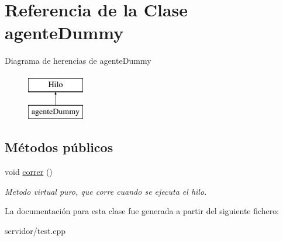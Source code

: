 \hypertarget{classagenteDummy}{\section{\-Referencia de la \-Clase agente\-Dummy}
\label{classagenteDummy}
}
\-Diagrama de herencias de agente\-Dummy\begin{figure}[H]
\begin{center}
\leavevmode
\includegraphics[height=2.000000cm]{classagenteDummy}
\end{center}
\end{figure}
\subsection*{\-Métodos públicos}
\begin{DoxyCompactItemize}
\item 
\hypertarget{classagenteDummy_a9de34fb738e72f3ee2dfa7432cdaf546}{void \hyperlink{classagenteDummy_a9de34fb738e72f3ee2dfa7432cdaf546}{correr} ()}\label{classagenteDummy_a9de34fb738e72f3ee2dfa7432cdaf546}

\begin{DoxyCompactList}\small\item\em \-Metodo virtual puro, que corre cuando se ejecuta el hilo. \end{DoxyCompactList}\end{DoxyCompactItemize}


\-La documentación para esta clase fue generada a partir del siguiente fichero\-:\begin{DoxyCompactItemize}
\item 
servidor/test.\-cpp\end{DoxyCompactItemize}
